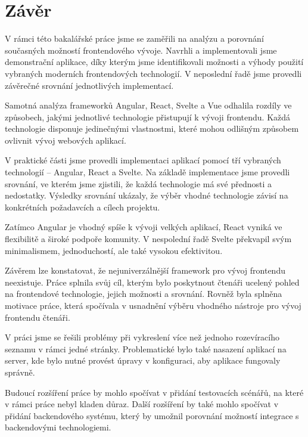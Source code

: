 \section*{Závěr}

\begin{zvyraznenyodstavec}
V rámci této bakalářské práce jsme se zaměřili na analýzu a porovnání současných možností frontendového vývoje. 
Navrhli a implementovali jsme demonstrační aplikace, díky kterým jsme identifikovali možnosti a výhody použití vybraných moderních frontendových technologií. 
V neposlední řadě jsme provedli závěrečné srovnání jednotlivých implementací.

Samotná analýza frameworků Angular, React, Svelte a Vue odhalila rozdíly ve způsobech, jakými jednotlivé technologie přistupují k vývoji frontendu. 
Každá technologie disponuje jedinečnými vlastnostmi, které mohou odlišným způsobem ovlivnit vývoj webových aplikací. 

V praktické části jsme provedli implementaci aplikací pomocí tří vybraných technologií -- Angular, React a Svelte. 
Na základě implementace jsme provedli srovnání, ve kterém jsme zjistili, že každá technologie má své přednosti a nedostatky. 
Výsledky srovnání ukázaly, že výběr vhodné technologie závisí na konkrétních požadavcích a cílech projektu.

Zatímco Angular je vhodný spíše k vývoji velkých aplikací, React vyniká ve flexibilitě a široké podpoře komunity. 
V nespolední řadě Svelte překvapil svým minimalismem, jednoduchostí, ale také vysokou efektivitou.

Závěrem lze konstatovat, že nejuniverzálnější framework pro vývoj frontendu neexistuje. 
Práce splnila svůj cíl, kterým bylo poskytnout čtenáři ucelený pohled na frontendové technologie, jejich možnosti a srovnání.
Rovněž byla splněna motivace práce, která spočívala v usnadnění výběru vhodného nástroje pro vývoj frontendu čtenáři.

V práci jsme se řešili problémy při vykreslení více než jednoho rozevíracího seznamu v rámci jedné stránky. 
Problematické bylo také nasazení aplikací na server, kde bylo nutné provést úpravy v konfiguraci, aby aplikace fungovaly správně.

Budoucí rozšíření práce by mohlo spočívat v přidání testovacích scénářů, na které v rámci práce nebyl kladen důraz. 
Další rozšíření by také mohlo spočívat v přidání backendového systému, který by umožnil porovnání možností integrace s backendovými technologiemi.
\end{zvyraznenyodstavec}

